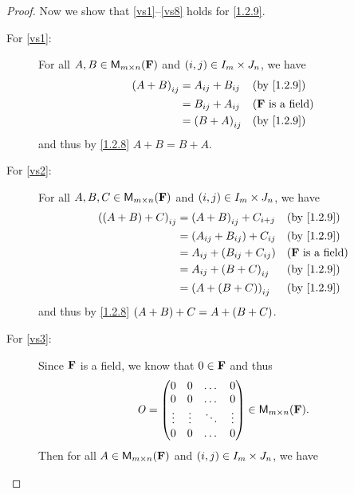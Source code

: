 \begin{proof}
    Now we show that \ref{vs1}--\ref{vs8} holds for \cref{1.2.9}.
    \begin{description}
        \item[For \ref{vs1}:]
            For all \(A, B \in {\mathsf{M}_{{m} \times n}({\mathbf{F}})}\) and \(\left\lparen i, j\right\rparen \in I_{m} \times J_{n}\), we have
            \begin{align*}
                \p{A + B}_{i j} & = A_{i j} + B_{i j} &  & \text{(by \cref{1.2.9})}   \\
                                & = B_{i j} + A_{i j} &  & \text{(\(\F\) is a field)} \\
                                & = \p{B + A}_{i j}   &  & \text{(by \cref{1.2.9})}
            \end{align*}
            and thus by \cref{1.2.8} \(A + B = B + A\).
        \item[For \ref{vs2}:]
            For all \(A, B, C \in {\mathsf{M}_{{m} \times n}({\mathbf{F}})}\) and \(\left\lparen i, j\right\rparen \in I_{m} \times J_{n}\), we have
            \begin{align*}
                \p{\p{A + B} + C}_{i j} & = \p{A + B}_{i j} + C_{i + j}     &  & \text{(by \cref{1.2.9})}   \\
                                        & = \p{A_{i j} + B_{i j}} + C_{i j} &  & \text{(by \cref{1.2.9})}   \\
                                        & = A_{i j} + \p{B_{i j} + C_{i j}} &  & \text{(\(\F\) is a field)} \\
                                        & = A_{i j} + \p{B + C}_{i j}       &  & \text{(by \cref{1.2.9})}   \\
                                        & = \p{A + \p{B + C}}_{i j}         &  & \text{(by \cref{1.2.9})}
            \end{align*}
            and thus by \cref{1.2.8} \(\left\lparen A + B\right\rparen + C = A + \left\lparen B + C\right\rparen\).
        \item[For \ref{vs3}:]
            Since \(\mathbf{F}\) is a field, we know that \(0 \in \mathbf{F}\) and thus
            \[
                \mathit{O} = \begin{pmatrix}
                    0      & 0      & \dots  & 0      \\
                    0      & 0      & \dots  & 0      \\
                    \vdots & \vdots & \ddots & \vdots \\
                    0      & 0      & \dots  & 0
                \end{pmatrix} \in {\mathsf{M}_{{m} \times n}({\mathbf{F}})}.
            \]
            Then for all \(A \in {\mathsf{M}_{{m} \times n}({\mathbf{F}})}\) and \(\left\lparen i, j\right\rparen \in I_{m} \times J_{n}\), we have

\end{description}
\end{proof}
